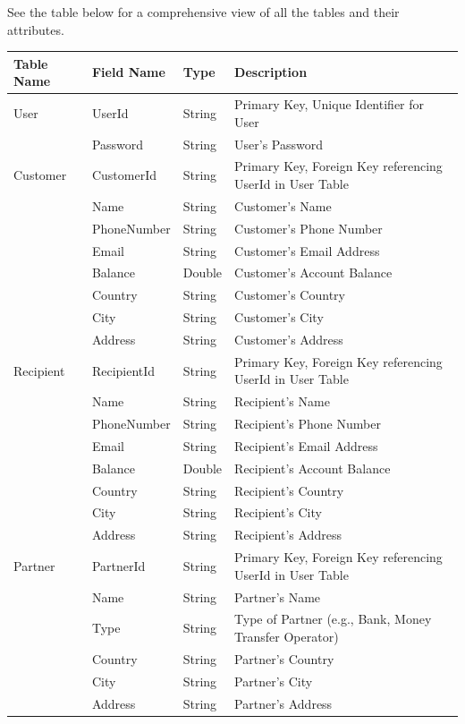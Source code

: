 \documentclass[onecolumn, letterpaper, ]{report}
\begin{document}
    See the table below for a comprehensive view of all the tables and their attributes.

        \begin{longtable}{|l|l|l|p{5cm}|}
\hline
\textbf{Table Name} & \textbf{Field Name} & \textbf{Type} & \textbf{Description} \\
\hline
\endhead
User & UserId & String & Primary Key, Unique Identifier for User \\
 & Password & String & User's Password \\
\hline
Customer & CustomerId & String & Primary Key, Foreign Key referencing UserId in User Table \\
 & Name & String & Customer's Name \\
 & PhoneNumber & String & Customer's Phone Number \\
 & Email & String & Customer's Email Address \\
 & Balance & Double & Customer's Account Balance \\
 & Country & String & Customer's Country \\
 & City & String & Customer's City \\
 & Address & String & Customer's Address \\
\hline
Recipient & RecipientId & String & Primary Key, Foreign Key referencing UserId in User Table \\
 & Name & String & Recipient's Name \\
 & PhoneNumber & String & Recipient's Phone Number \\
 & Email & String & Recipient's Email Address \\
 & Balance & Double & Recipient's Account Balance \\
 & Country & String & Recipient's Country \\
 & City & String & Recipient's City \\
 & Address & String & Recipient's Address \\
\hline
Partner & PartnerId & String & Primary Key, Foreign Key referencing UserId in User Table \\
 & Name & String & Partner's Name \\
 & Type & String & Type of Partner (e.g., Bank, Money Transfer Operator) \\
 & Country & String & Partner's Country \\
 & City & String & Partner's City \\
 & Address & String & Partner's Address \\

\end{longtable}
\end{document}
